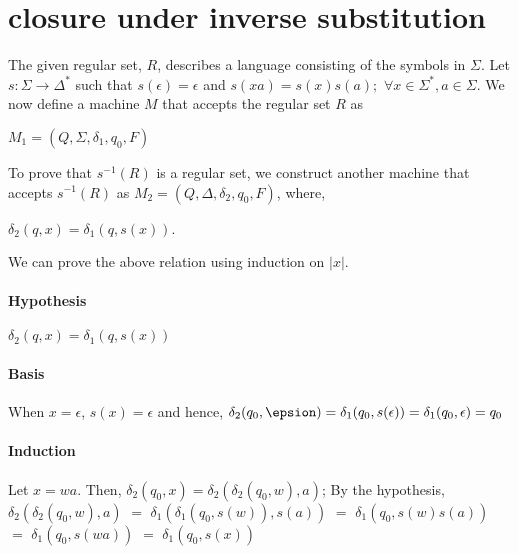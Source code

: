 \documentclass[11pt,letterpaper]{article}
\begin{document}
\section{closure under inverse substitution}
The given regular set, $R$, describes a language consisting of the symbols in $\Sigma$. Let $s:\Sigma \rightarrow \Delta^*$ such that $s(\epsilon) = \epsilon$ and $s(xa) = s(x)s(a);$ $\forall x \in \Sigma^*, a \in \Sigma$. We now define a machine $M$ that accepts the regular set $R$ as 
\begin{center}
    $M_1=(Q,\Sigma,\delta_1,q_0,F)$ 
\end{center}
To prove that $s^{-1}(R)$ is a regular set, we construct another machine that accepts $s^{-1}(R)$ as $M_2=(Q,\Delta,\delta_2,q_0,F)$, where,
\begin{center}
    $\delta_2(q,x)=\delta_1(q,s(x))$.
\end{center}
We can prove the above relation using induction on $|x|$. 
\paragraph{Hypothesis} $\delta_2(q,x)=\delta_1(q,s(x))$
\paragraph{Basis} When $x=\epsilon$, $s(x)=\epsilon$ and hence, $\delta_2(q_0,\epsion) = \delta_1(q_0,s(\epsilon)) = \delta_1(q_0,\epsilon) = q_0$
\paragraph{Induction} Let $x=wa$. Then, $\delta_2(q_0,x) = \delta_2(\delta_2(q_0,w),a)$; By the hypothesis, $\delta_2(\delta_2(q_0,w),a)$ $=$ $\delta_1(\delta_1(q_0,s(w)),s(a))$ $=$ $\delta_1(q_0,s(w)s(a))$ $=$ $\delta_1(q_0,s(wa))$ $=$ $\delta_1(q_0,s(x))$
\end{document}
